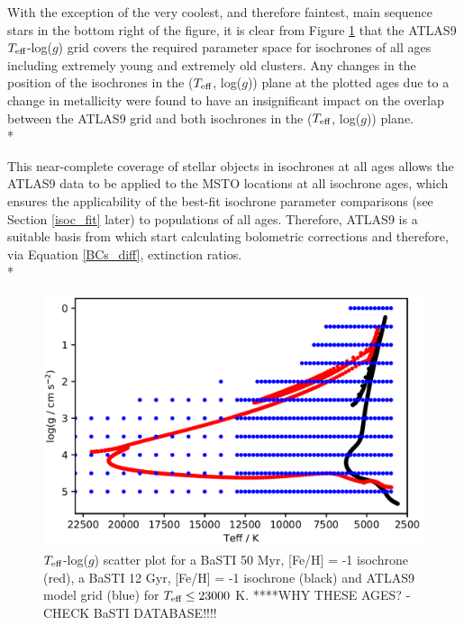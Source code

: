 \documentclass[12pt, a4paper]{report}
\begin{document}
With the exception of the very coolest, and therefore faintest, main sequence stars in the bottom right of the figure, it is clear from Figure \ref{Teff-logg coverage} that the ATLAS9 $T_{\textnormal{eff}}$-log($g$) grid covers the required parameter space for isochrones of all ages including extremely young and extremely old clusters. Any changes in the position of the isochrones in the ($T_{\textnormal{eff}}$, log($g$)) plane at the plotted ages due to a change in metallicity were found to have an insignificant impact on the overlap between the ATLAS9 grid and both isochrones in the ($T_{\textnormal{eff}}$, log($g$)) plane. \\*

This near-complete coverage of stellar objects in isochrones at all ages allows the ATLAS9 data to be applied to the MSTO locations at all isochrone ages, which ensures the applicability of the best-fit isochrone parameter comparisons (see Section \ref{isoc_fit} later) to populations of all ages. Therefore, ATLAS9 is a suitable basis from which start calculating bolometric corrections and therefore, via Equation \ref{BCs_diff}, extinction ratios. \\*

\begin{figure}[h]
\begin{center}
\includegraphics[width=1.0\textwidth]{ATLAS9_grid_BaSTI_coverage_2ages_crop.png}
\caption{$T_{\textnormal{eff}}$-log($g$) scatter plot for a BaSTI 50 Myr, [Fe/H] = -1 isochrone (red), a BaSTI 12 Gyr, [Fe/H] = -1 isochrone (black) and ATLAS9 model grid (blue) for $T_{\textnormal{eff}} \leq 23000$ K. ****WHY THESE AGES? - CHECK BaSTI DATABASE!!!!}
\label{Teff-logg coverage}
\end{center}
\end{figure}
\end{document}
